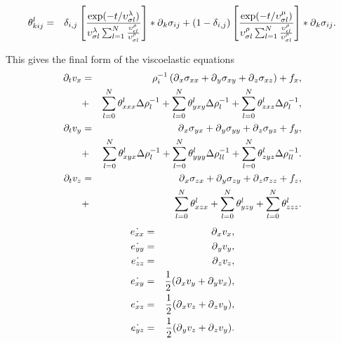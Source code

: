 \documentclass[11pt]{article}
\begin{document}
\begin{eqnarray}
 \theta^l_{kij}    
   & = & \delta_{i,j}\left[\frac{\exp(-t/\upsilon^{\lambda}_{\sigma l})}
                    {\upsilon^{\lambda}_{\sigma l}
                    \sum_{l=1}^N \frac{\upsilon^{\rho}_{\epsilon l}}
                    {\upsilon^{\rho}_{\sigma l}}}\right] 
                    *\mbox{$\partial$}_k \sigma_{ij}
    +  (1-\delta_{i,j})\left[\frac{\exp(-t/\upsilon^{\mu}_{\sigma l})}
                    {\upsilon^{\rho}_{\sigma l}
                    \sum_{l=1}^N \frac{\upsilon^{\rho}_{\epsilon l}}
                    {\upsilon^{\rho}_{\sigma l}}}\right] 
                    *\mbox{$\partial$}_k \sigma_{ij}.
\end{eqnarray}


This gives the final form of the viscoelastic equations
%
\begin{eqnarray}
  \partial_t{v}_x 
     & = & \rho^{-1}_i\left(\mbox{$\partial$}_x \sigma_{xx} +\mbox{$\partial$}_y 
           \sigma_{xy} +\mbox{$\partial$}_z \sigma_{xz}\right) + f_x,       \nonumber\\
     & + & \sum_{l=0}^N\theta^l_{xxx}\Delta\rho^{-1}_{l} 
           +  \sum_{l=0}^N\theta^l_{yxy}\Delta\rho^{-1}_{l} 
           +  \sum_{l=0}^N\theta^l_{zxz}\Delta\rho^{-1}_{l}, \nonumber\\ 
  \partial_t{v}_y 
     & = & \mbox{$\partial$}_x \sigma_{yx} +\mbox{$\partial$}_y \sigma_{yy} +\mbox{$\partial$}_z 
           \sigma_{yz} + f_y,                                \nonumber\\
     & + & \sum_{l=0}^N\theta^l_{xyx}\Delta\rho^{-1}_{l} 
           +  \sum_{l=0}^N\theta^l_{yyy}\Delta\rho^{-1}_{ll} 
           +  \sum_{l=0}^N\theta^l_{zyz}\Delta\rho^{-1}_{ll}.\nonumber\\ 
  \partial_t{v}_z 
    & = & \mbox{$\partial$}_x \sigma_{zx} +\mbox{$\partial$}_y \sigma_{zy} 
          +\mbox{$\partial$}_z \sigma_{zz} + f_z,                           \nonumber\\
    & + & \sum_{l=0}^N\theta^l_{xzx} +  \sum_{l=0}^N\theta^l_{yzy} +  
          \sum_{l=0}^N\theta^l_{zzz}.                        \nonumber\\
\end{eqnarray}
\begin{eqnarray}
    \dot{e_{xx}} & = & \mbox{$\partial$}_x v_x, \nonumber\\
    \dot{e_{yy}} & = & \mbox{$\partial$}_y v_y, \nonumber\\
    \dot{e_{zz}} & = & \mbox{$\partial$}_z v_z, \nonumber\\
    \dot{e_{xy}} & = & \frac{1}{2}(\mbox{$\partial$}_x v_y + \mbox{$\partial$}_y v_x),\nonumber\\
    \dot{e_{xz}} & = & \frac{1}{2}(\mbox{$\partial$}_x v_z + \mbox{$\partial$}_z v_y),\nonumber\\
    \dot{e_{yz}} & = & \frac{1}{2}(\mbox{$\partial$}_y v_z + \mbox{$\partial$}_z v_y).\nonumber\\
\end{eqnarray}
\end{document}
